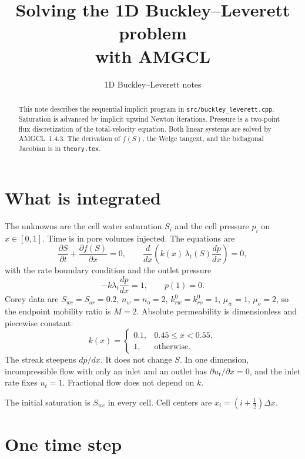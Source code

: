 \documentclass[11pt]{article}
\title{Solving the 1D Buckley--Leverett problem\\ with AMGCL}
\author{1D Buckley--Leverett notes}
\date{}
\begin{document}
\maketitle

\begin{abstract}
This note describes the sequential implicit program in \texttt{src/buckley\_leverett.cpp}.
Saturation is advanced by implicit upwind Newton iterations.
Pressure is a two-point flux discretization of the total-velocity equation.
Both linear systems are solved by AMGCL~1.4.3.
The derivation of $f(S)$, the Welge tangent, and the bidiagonal Jacobian is in \texttt{theory.tex}.
\end{abstract}

\section{What is integrated}

The unknowns are the cell water saturation $S_i$ and the cell pressure $p_i$ on $x\in[0,1]$.
Time is in pore volumes injected.
The equations are
\begin{equation}
\label{eq:pde}
\frac{\partial S}{\partial t} + \frac{\partial f(S)}{\partial x} = 0,
\qquad
\frac{d}{dx}\!\left(k(x)\,\lambda_t(S)\frac{dp}{dx}\right) = 0,
\end{equation}
with the rate boundary condition and the outlet pressure
\begin{equation}
\label{eq:p-bc}
-k\lambda_t\frac{dp}{dx} = 1,
\qquad
p(1) = 0.
\end{equation}
Corey data are $S_{wc}=S_{or}=0.2$, $n_w=n_o=2$, $k_{rw}^{0}=k_{ro}^{0}=1$, $\mu_w=1$, $\mu_o=2$, so the endpoint mobility ratio is $M=2$.
Absolute permeability is dimensionless and piecewise constant:
\begin{equation}
\label{eq:k}
k(x) =
\begin{cases}
0.1, & 0.45 \le x < 0.55,\\
1, & \text{otherwise.}
\end{cases}
\end{equation}
The streak steepens $dp/dx$.
It does not change $S$.
In one dimension, incompressible flow with only an inlet and an outlet has $\partial u_t/\partial x = 0$, and the inlet rate fixes $u_t = 1$.
Fractional flow does not depend on $k$.

The initial saturation is $S_{wc}$ in every cell.
Cell centers are $x_i = (i+\tfrac12)\Delta x$.

\section{One time step}
\end{document}
